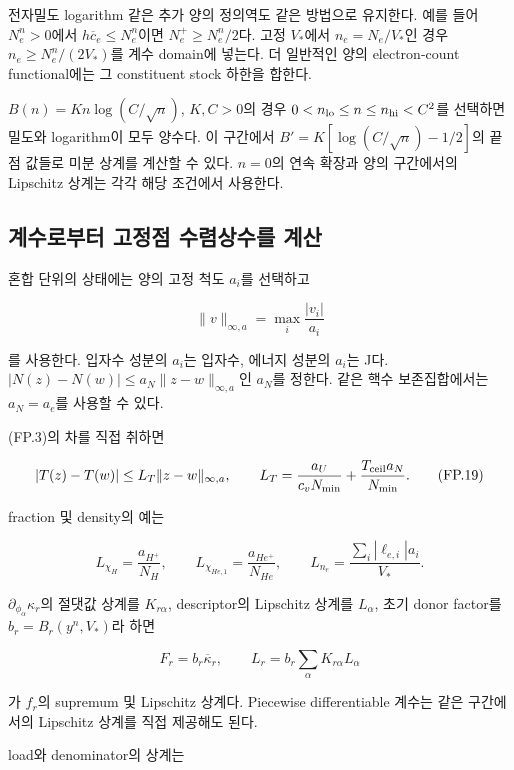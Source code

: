 \documentclass[11pt,a4paper]{article}
\begin{document}
전자밀도 logarithm 같은 추가 양의 정의역도 같은 방법으로 유지한다. 예를 들어 \(N_e^n>0\)에서 \(h\overline c_e\le N_e^n\)이면 \(N_e^+\ge N_e^n/2\)다. 고정 \(V_*\)에서 \(n_e=N_e/V_*\)인 경우 \(n_e\ge N_e^n/(2V_*)\)를 계수 domain에 넣는다. 더 일반적인 양의 electron-count functional에는 그 constituent stock 하한을 합한다.

\(B(n)=K n\log(C/\sqrt n)\), \(K,C>0\)의 경우 \(0<n_{\rm lo}\le n\le n_{\rm hi}<C^2\)를 선택하면 밀도와 logarithm이 모두 양수다. 이 구간에서 \(B'=K[\log(C/\sqrt n)-1/2]\)의 끝점 값들로 미분 상계를 계산할 수 있다. \(n=0\)의 연속 확장과 양의 구간에서의 Lipschitz 상계는 각각 해당 조건에서 사용한다.

\hypertarget{uxacc4uxc218uxb85cuxbd80uxd130-uxace0uxc815uxc810-uxc218uxb834uxc0c1uxc218uxb97c-uxacc4uxc0b0}{%
\subsection{계수로부터 고정점 수렴상수를 계산}\label{uxacc4uxc218uxb85cuxbd80uxd130-uxace0uxc815uxc810-uxc218uxb834uxc0c1uxc218uxb97c-uxacc4uxc0b0}}

혼합 단위의 상태에는 양의 고정 척도 \(a_i\)를 선택하고

\[
\|v\|_{\infty,a}=\max_i\frac{|v_i|}{a_i}
\tag{FP.18}
\]

를 사용한다. 입자수 성분의 \(a_i\)는 입자수, 에너지 성분의 \(a_i\)는 J다. \(|N(z)-N(w)|\le a_N\|z-w\|_{\infty,a}\)인 \(a_N\)를 정한다. 같은 핵수 보존집합에서는 \(a_N=a_e\)를 사용할 수 있다.

(FP.3)의 차를 직접 취하면

\[
|T(z)-T(w)|
\le L_T\|z-w\|_{\infty,a},\qquad
L_T=\frac{a_U}{c_vN_{\min}}
+\frac{T_{\rm ceil}a_N}{N_{\min}}.
\tag{FP.19}
\]

fraction 및 density의 예는

\[
L_{\chi_H}=\frac{a_{H^+}}{N_H},\qquad
L_{\chi_{He,1}}=\frac{a_{He^+}}{N_{He}},\qquad
L_{n_e}=\frac{\sum_i|\ell_{e,i}|a_i}{V_*}.
\tag{FP.20}
\]

\(\partial_{\phi_\alpha}\kappa_r\)의 절댓값 상계를 \(K_{r\alpha}\), descriptor의 Lipschitz 상계를 \(L_\alpha\), 초기 donor factor를 \(b_r=B_r(y^n,V_*)\)라 하면

\[
F_r=b_r\overline\kappa_r,\qquad
L_r=b_r\sum_\alpha K_{r\alpha}L_\alpha
\tag{FP.21}
\]

가 \(f_r\)의 supremum 및 Lipschitz 상계다. Piecewise differentiable 계수는 같은 구간에서의 Lipschitz 상계를 직접 제공해도 된다.

load와 denominator의 상계는
\end{document}
